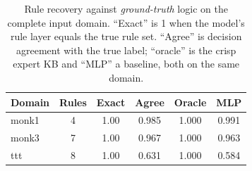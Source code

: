 \begin{table}[t]\centering\small
\caption{Rule recovery against \emph{ground-truth} logic on the complete input domain. ``Exact'' is 1 when the model's rule layer equals the true rule set. ``Agree'' is decision agreement with the true label; ``oracle'' is the crisp expert KB and ``MLP'' a baseline, both on the same domain.}
\label{tab:structural}
\begin{tabular}{lccccc}
\toprule
Domain & Rules & Exact & Agree & Oracle & MLP \\
\midrule
monk1 & 4 & 1.00 & 0.985 & 1.000 & 0.991 \\
monk3 & 7 & 1.00 & 0.967 & 1.000 & 0.963 \\
ttt & 8 & 1.00 & 0.631 & 1.000 & 0.584 \\
\end{tabular}
\end{table}